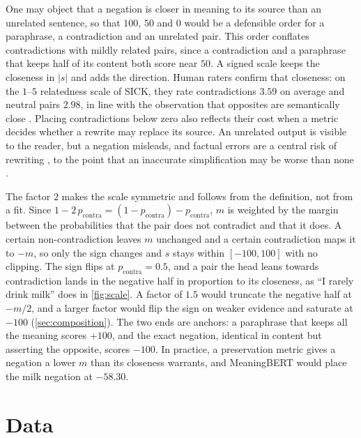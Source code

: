\documentclass[11pt]{article}
\begin{document}
One may object that a negation is closer in meaning to its source than an unrelated sentence, so that $100$, $50$ and $0$ would be a defensible order for a paraphrase, a contradiction and an unrelated pair.
This order conflates contradictions with mildly related pairs, since a contradiction and a paraphrase that keeps half of its content both score near $50$.
A signed scale keeps the closeness in $|s|$ and adds the direction.
Human raters confirm that closeness: on the $1$--$5$ relatedness scale of SICK, they rate contradictions $3.59$ on average and neutral pairs $2.98$, in line with the observation that opposites are semantically close \citep{mohammad2013contrast,hill2015simlex}.
Placing contradictions below zero also reflects their cost when a metric decides whether a rewrite may replace its source.
An unrelated output is visible to the reader, but a negation misleads, and factual errors are a central risk of rewriting \citep{maynez2020faithfulness}, to the point that an inaccurate simplification may be worse than none \citep{devaraj2022factuality}.



The factor $2$ makes the scale symmetric and follows from the definition, not from a fit.
Since $1 - 2\,p_{\mathrm{contra}} = (1 - p_{\mathrm{contra}}) - p_{\mathrm{contra}}$, $m$ is weighted by the margin between the probabilities that the pair does not contradict and that it does.
A certain non-contradiction leaves $m$ unchanged and a certain contradiction maps it to $-m$, so only the sign changes and $s$ stays within $[-100, 100]$ with no clipping.
The sign flips at $p_{\mathrm{contra}} = 0.5$, and a pair the head leans towards contradiction lands in the negative half in proportion to its closeness, as ``I rarely drink milk'' does in \autoref{fig:scale}.
A factor of $1.5$ would truncate the negative half at $-m/2$, and a larger factor would flip the sign on weaker evidence and saturate at $-100$ (\autoref{sec:composition}).
The two ends are anchors: a paraphrase that keeps all the meaning scores $+100$, and the exact negation, identical in content but asserting the opposite, scores $-100$.
In practice, a preservation metric gives a negation a lower $m$ than its closeness warrants, and MeaningBERT would place the milk negation at $-58.30$.

\section{Data}
\label{sec:data}
\end{document}
